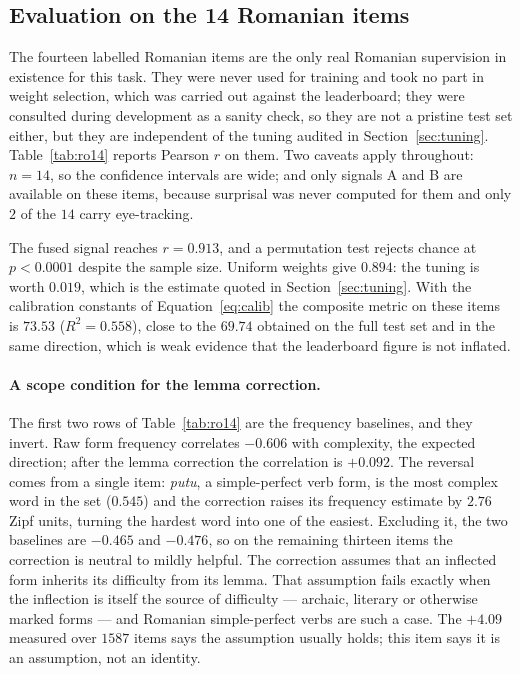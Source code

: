 \subsection{Evaluation on the 14 Romanian items}
\label{sec:14items}

The fourteen labelled Romanian items are the only real Romanian
supervision in existence for this task. They were never used for
training and took no part in weight selection, which was carried out
against the leaderboard; they were consulted during development as a
sanity check, so they are not a pristine test set either, but they are
independent of the tuning audited in Section~\ref{sec:tuning}.
Table~\ref{tab:ro14} reports Pearson $r$ on them. Two caveats apply
throughout: $n = 14$, so the confidence intervals are wide; and only
signals A and B are available on these items, because surprisal was
never computed for them and only $2$ of the $14$ carry eye-tracking.

The fused signal reaches $r = 0.913$, and a permutation test rejects
chance at $p < 0.0001$ despite the sample size. Uniform weights give
$0.894$: the tuning is worth $0.019$, which is the estimate quoted in
Section~\ref{sec:tuning}. With the calibration constants of
Equation~\ref{eq:calib} the composite metric on these items is $73.53$
($R^2 = 0.558$), close to the $69.74$ obtained on the full test set and
in the same direction, which is weak evidence that the leaderboard
figure is not inflated.

\paragraph{A scope condition for the lemma correction.}
The first two rows of Table~\ref{tab:ro14} are the frequency baselines,
and they invert. Raw form frequency correlates $-0.606$ with
complexity, the expected direction; after the lemma correction the
correlation is $+0.092$. The reversal comes from a single item:
\emph{putu}, a simple-perfect verb form, is the most complex word in the
set ($0.545$) and the correction raises its frequency estimate by
$2.76$ Zipf units, turning the hardest word into one of the easiest.
Excluding it, the two baselines are $-0.465$ and $-0.476$, so on the
remaining thirteen items the correction is neutral to mildly helpful.
The correction assumes that an inflected form inherits its difficulty
from its lemma. That assumption fails exactly when the inflection is
itself the source of difficulty --- archaic, literary or otherwise
marked forms --- and Romanian simple-perfect verbs are such a case. The
$+4.09$ measured over $1587$ items says the assumption usually holds;
this item says it is an assumption, not an identity.


